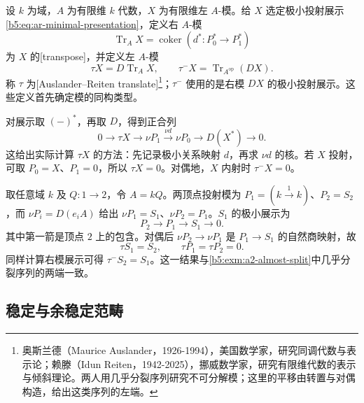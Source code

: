\begin{definition}\label{b5:def:ar-transpose-translate}
	设 \(k\) 为域，\(A\) 为有限维 \(k\) 代数，\(X\) 为有限维左 \(A\)-模。给 \(X\) 选定极小投射展示\eqref{b5:eq:ar-minimal-presentation}，定义右 \(A\)-模
	\[
		\operatorname{Tr}_A X
		=\operatorname{coker}(d^*:P_0^*\to P_1^*)
	\]
	为 \(X\) 的[transpose]，并定义左 \(A\)-模
	\[
		\tau X=D\operatorname{Tr}_A X,
		\qquad \tau^-X=\operatorname{Tr}_{A^{\mathrm{op}}}(DX).
	\]
	称 \(\tau\) 为[Auslander--Reiten translate]\footnote{奥斯兰德（Maurice Auslander，1926-1994），美国数学家，研究同调代数与表示论；赖滕（Idun Reiten，1942-2025），挪威数学家，研究有限维代数的表示与倾斜理论。两人用几乎分裂序列研究不可分解模；这里的平移由转置与对偶构造，给出这类序列的左端。}；\(\tau^-\) 使用的是右模 \(DX\) 的极小投射展示。这些定义首先确定模的同构类型。
\end{definition}

对展示取 \((-)^*\)，再取 \(D\)，得到正合列
\begin{equation}\label{b5:eq:ar-dual-presentation}
	0\longrightarrow\tau X\longrightarrow\nu P_1
	\xrightarrow{\nu d}\nu P_0\longrightarrow D(X^*)\longrightarrow0.
\end{equation}
这给出实际计算 \(\tau X\) 的方法：先记录极小关系映射 \(d\)，再求 \(\nu d\) 的核。若 \(X\) 投射，可取 \(P_0=X\)、\(P_1=0\)，所以 \(\tau X=0\)。对偶地，\(X\) 内射时 \(\tau^-X=0\)。

\begin{example}\label{b5:exm:ar-a2-translate}
	取任意域 \(k\) 及 \(Q:1\to2\)，令 \(A=kQ\)。两顶点投射模为 \(P_1=(k\xrightarrow{1}k)\)、\(P_2=S_2\)，而 \(\nu P_i=D(e_iA)\) 给出 \(\nu P_1=S_1\)、\(\nu P_2=P_1\)。\(S_1\) 的极小展示为
	\[
		P_2\longrightarrow P_1\longrightarrow S_1\longrightarrow0.
	\]
	其中第一箭是顶点 \(2\) 上的包含。对偶后 \(\nu P_2\to\nu P_1\) 是 \(P_1\to S_1\) 的自然商映射，故
	\[
		\tau S_1=S_2,\qquad\tau P_1=\tau P_2=0.
	\]
	同样计算右模展示可得 \(\tau^-S_2=S_1\)。这一结果与\cref{b5:exm:a2-almost-split}中几乎分裂序列的两端一致。
\end{example}

\subsection{稳定与余稳定范畴}
\label{b5:subsec:1006:02}

